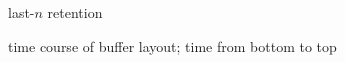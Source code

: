 \begin{figure*}
\begin{minipage}{0.91\linewidth}
{\begin{minipage}{\linewidth}
  \vspace{-2.5ex}
\end{minipage}}%
\endgroup

\end{minipage}%

\begin{subfigure}{0.2\textwidth}
  \caption{\footnotesize last-$n$ \hv{} retention}
  \label{fig:hanoi-intuition:last-n}
\end{subfigure}%
\begin{subfigure}{0.8\textwidth}
  \caption{\footnotesize time course of buffer layout; time from bottom to top}
  \label{fig:hanoi-intuition:buffer-layout}
\end{subfigure}%


\end{figure*}
